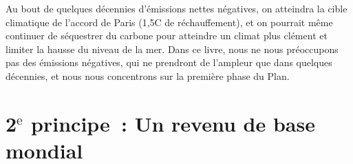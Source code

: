 \documentclass[a5paper,french,openany]{memoir}
\begin{document}
Au bout de quelques décennies d'émissions nettes négatives, on atteindra la cible climatique de l'accord de Paris (1,5\textdegree{}C de réchauffement), et on pourrait même continuer de séquestrer du carbone pour atteindre un climat plus clément et limiter la hausse du niveau de la mer. Dans ce livre, nous ne nous préoccupons pas des émissions négatives, qui ne prendront de l'ampleur que dans quelques décennies, et nous nous concentrons sur la première phase du Plan. 

\section{2$^\text{e}$ principe~: Un revenu de base mondial}\label{pcp:rdb}
\end{document}
